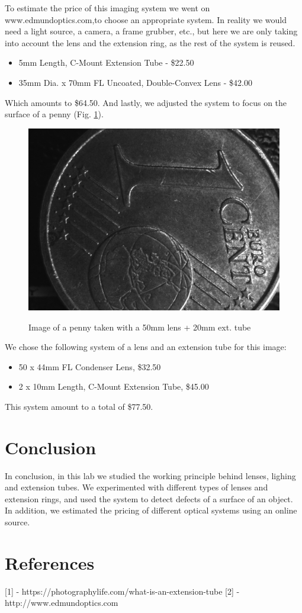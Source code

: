 \documentclass[english]{article}
\begin{document}
To estimate the price of this imaging system we went on www.edmundoptics.com,to choose an appropriate system. In reality we would need a light source, a camera, a frame grubber, etc., but here we are only taking into account the lens and the extension ring, as the rest of the system is reused.\\
\begin{itemize}
\item 
5mm Length, C-Mount Extension Tube - \$22.50\\
\item 35mm Dia. x 70mm FL Uncoated, Double-Convex Lens - \$42.00
\end{itemize}
Which amounts to \$64.50. 
And lastly, we adjusted the system to focus on the surface of a penny (Fig. \ref{fig:nine}).
\begin{figure}[H]
	\centering
	{\label{fig:}
	\includegraphics[width=0.7\linewidth]		{Pictures/bonus/50+20coin_distance_20mm_adj.png}
	}
	\caption{Image of a penny taken with a 50mm lens + 20mm ext. tube}
	\label{fig:nine}
\end{figure}
We chose the following system of a lens and an extension tube for this image:\\
\begin{itemize}
\item 50 x 44mm FL Condenser Lens, \$32.50\\
\item 2 x 10mm Length, C-Mount Extension Tube, \$45.00\\
\end{itemize}
This system amount to a total of \$77.50.

\section{Conclusion}
In conclusion, in this lab we studied the working principle behind lenses, lighing and extension tubes.
We experimented with different types of lenses and extension rings, and used the system to detect defects of a surface of an object. In addition, we estimated the pricing of different optical systems using an online source.

\section{References}
{[}1{]} - https://photographylife.com/what-is-an-extension-tube
{[}2{]} - http://www.edmundoptics.com
\end{document}
